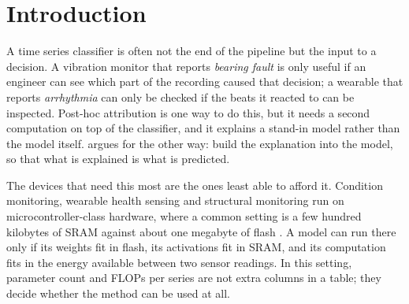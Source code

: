 %

\section{Introduction}
\label{sec:intro}

A time series classifier is often not the end of the pipeline but the input to a decision. A
vibration monitor that reports \emph{bearing fault} is only useful if an engineer can see which part
of the recording caused that decision; a wearable that reports \emph{arrhythmia} can only be checked
if the beats it reacted to can be inspected. Post-hoc attribution \citep{ribeiro2016lime,
lundberg2017shap, sundararajan2017ig} is one way to do this, but it needs a second computation on top
of the classifier, and it explains a stand-in model rather than the model itself.
\citet{rudin2019stop} argues for the other way: build the explanation into the model, so that what is
explained is what is predicted.

The devices that need this most are the ones least able to afford it. Condition monitoring, wearable
health sensing and structural monitoring run on microcontroller-class hardware, where a common
setting is a few hundred kilobytes of SRAM against about one megabyte of flash \citep{lin2020mcunet,
banbury2021micronets}. A model can run there only if its weights fit in flash, its activations fit in
SRAM, and its computation fits in the energy available between two sensor readings. In this setting,
parameter count and FLOPs per series are not extra columns in a table; they decide whether the method
can be used at all.

